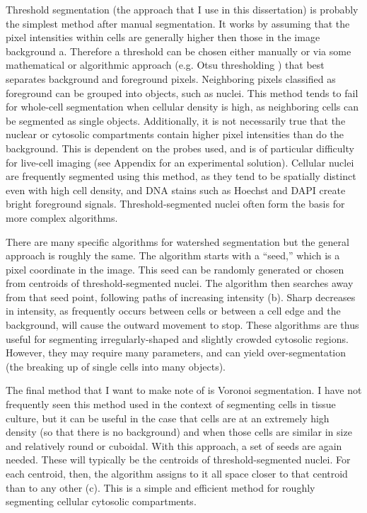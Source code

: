   
Threshold segmentation (the approach that I use in this
dissertation) is probably the simplest method after manual
segmentation. It works by assuming that the pixel intensities
within cells are generally higher then those in the image
background a.
Therefore a threshold can be chosen either manually
or via some mathematical or algorithmic approach (e.g.
Otsu thresholding \cite{Otsu1975}) that best separates
background and foreground pixels. Neighboring pixels classified
as foreground can be grouped into
objects, such as nuclei. This method tends to fail for whole-cell
segmentation when
cellular density is high, as neighboring cells can be segmented
as single objects. Additionally, it is not necessarily true
that the nuclear or cytosolic compartments contain higher
pixel intensities than do the background. This is dependent
on the probes used, and is of particular difficulty for
live-cell imaging (see Appendix  for an experimental solution).
Cellular nuclei are frequently
segmented using this method, as they tend to be spatially distinct
even with high cell density, and DNA stains such as Hoechst
and DAPI create bright foreground signals. Threshold-segmented
nuclei often form the basis for more complex algorithms.


There are many specific algorithms for watershed segmentation
\cite{Vincent1991,Malpica1997,Loo2010} but the general
approach is roughly the same. The algorithm starts with
a ``seed,'' which is a pixel coordinate in the image.
This seed can be randomly generated or chosen from centroids
of threshold-segmented nuclei. The algorithm then searches
away from that seed point, following paths of increasing
intensity (b).
Sharp decreases in intensity, as frequently
occurs between cells or between a cell edge and the background,
will cause the outward movement to stop. These algorithms
are thus useful for segmenting irregularly-shaped and slightly
crowded cytosolic regions. However, they may require many parameters, and
can yield over-segmentation (the breaking up of single cells
into many objects).


The final method that I want to make note of is Voronoi
segmentation. I have not frequently seen this method used in
the context of segmenting cells in tissue culture, but it
can be useful in the case that cells are at an extremely
high density (so that there is no background) and when
those cells are similar in size and relatively round
or cuboidal. With this approach,
a set of seeds are again needed. These will typically be
the centroids of threshold-segmented nuclei. For each centroid,
then, the algorithm assigns to it all space closer to that centroid
than to any other (c).
This is a simple and efficient method for roughly segmenting
cellular cytosolic compartments.


